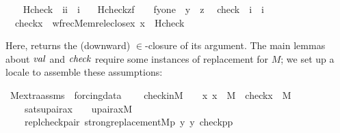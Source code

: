 \begin{isabelle}
\isamarkupfalse%
\ \isanewline
\ \ Hcheck\ {\isacharcolon}{\isacharcolon}\ {\isachardoublequoteopen}{\isacharbrackleft}i{\isacharcomma}i{\isacharbrackright}\ {\isasymRightarrow}\ i{\isachardoublequoteclose}\ \isanewline
\ \ {\isachardoublequoteopen}Hcheck{\isacharparenleft}z{\isacharcomma}f{\isacharparenright}\ \ {\isacharequal}{\isacharequal}\ {\isacharbraceleft}\ {\isacharless}f{\isacharbackquote}y{\isacharcomma}one{\isachargreater}\ {\isachardot}\ y\ {\isasymin}\ z{\isacharbraceright}{\isachardoublequoteclose}\isanewline
\isanewline
{}\isamarkupfalse%
\isanewline
\ \ check\ {\isacharcolon}{\isacharcolon}\ {\isachardoublequoteopen}i\ {\isasymRightarrow}\ i{\isachardoublequoteclose}\ \isanewline
\ \ {\isachardoublequoteopen}check{\isacharparenleft}x{\isacharparenright}\ {\isacharequal}{\isacharequal}\ wfrec{\isacharparenleft}Memrel{\isacharparenleft}eclose{\isacharparenleft}{\isacharbraceleft}x{\isacharbraceright}{\isacharparenright}{\isacharparenright}{\isacharcomma}\ x\ {\isacharcomma}\ Hcheck{\isacharparenright}{\isachardoublequoteclose}
\end{isabelle}
Here,  returns the (downward) $\in$-closure of its
argument. The main lemmas about $\operatorname{\mathit{val}}$ and $\operatorname{\mathit{check}}$ require some
instances of replacement for $M$; we set up a locale to assemble these
assumptions:
\begin{isabelle}
\isamarkupfalse%
\ M{\isacharunderscore}extra{\isacharunderscore}assms\ {\isacharequal}\ forcing{\isacharunderscore}data\ {\isacharplus}\isanewline
\ \ \ check{\isacharunderscore}in{\isacharunderscore}M\ {\isacharcolon}\ \ \  {\isachardoublequoteopen}{\isasymAnd}x{\isachardot}\ x\ {\isasymin}\ M\ {\isasymLongrightarrow}\ check{\isacharparenleft}x{\isacharparenright}\ {\isasymin}\ M{\isachardoublequoteclose}\isanewline
\ \ \ \ sats{\isacharunderscore}upair{\isacharunderscore}ax{\isacharcolon}\ \ \ \ {\isachardoublequoteopen}upair{\isacharunderscore}ax{\isacharparenleft}{\isacharhash}{\isacharhash}M{\isacharparenright}{\isachardoublequoteclose}\isanewline
\ \ \ \ repl{\isacharunderscore}check{\isacharunderscore}pair{\isacharcolon}\ {\isachardoublequoteopen}strong{\isacharunderscore}replacement{\isacharparenleft}{\isacharhash}{\isacharhash}M{\isacharcomma}{\isasymlambda}p\ y{\isachardot}\ y\ {\isacharequal}{\isacharless}check{\isacharparenleft}p{\isacharparenright}{\isacharcomma}p{\isachargreater}{\isacharparenright}{\isachardoublequoteclose}
\end{isabelle}


